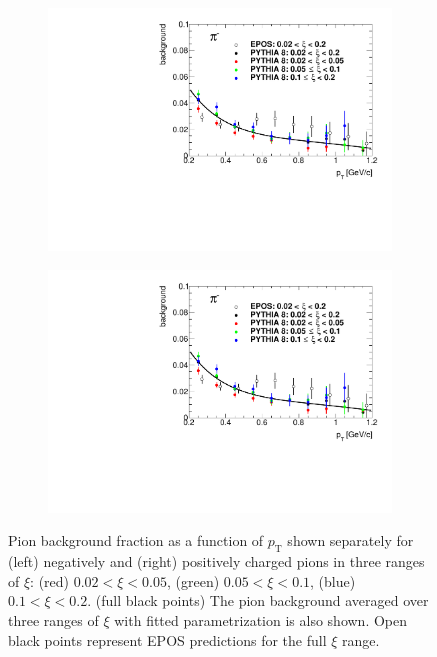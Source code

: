 \begin{figure}[h!]
	\centering
	\begin{subfigure}{.49\textwidth}
		\includegraphics[width=\linewidth, page=1]{chapters/chrgSTAR/img/chargedBkg/bkg0max.pdf}
	\end{subfigure}
	\begin{subfigure}{.49\textwidth}
		\includegraphics[width=\linewidth, page=2]{chapters/chrgSTAR/img/chargedBkg/bkg0max.pdf}
	\end{subfigure}
	\caption{Pion background fraction as a function of $p_\textrm{T}$ shown separately for  (left) negatively  and (right)  positively charged pions in three ranges of $\xi$: (red) $0.02<\xi<0.05$,  (green) $0.05<\xi<0.1$, (blue) $0.1<\xi<0.2$.  (full black points) The pion background averaged over three ranges of $\xi$ with fitted parametrization is also shown. Open black points represent EPOS predictions for the full $\xi$ range.}
	\label{fig:bkg_pion}
	\vspace{1.cm}
\end{figure}

\newpage
\FloatBarrier